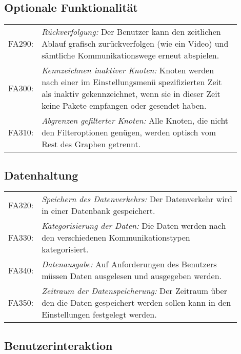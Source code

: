 \subsection{Optionale Funktionalität}
\begin{tabular}{lp{0.9\linewidth}}

FA290: & \textit{Rückverfolgung: }Der Benutzer kann den zeitlichen Ablauf grafisch zurückverfolgen (wie ein Video) und sämtliche Kommunikationswege erneut abspielen. \\

FA300: & \textit{Kennzeichnen inaktiver Knoten: }Knoten werden nach einer im Einstellungsmenü spezifizierten Zeit als inaktiv gekennzeichnet, wenn sie in dieser Zeit keine Pakete empfangen oder gesendet haben. \\

FA310: & \textit{Abgrenzen gefilterter Knoten: }Alle Knoten, die nicht den Filteroptionen genügen, werden optisch vom Rest des Graphen getrennt. \\

\end{tabular}

\subsection{Datenhaltung}

\begin{tabular}{lp{0.9\linewidth}}

FA320: & \textit{Speichern des Datenverkehrs: }Der Datenverkehr wird in einer Datenbank gespeichert. \\

FA330: & \textit{Kategorisierung der Daten: }Die Daten werden nach den verschiedenen Kommunikationstypen kategorisiert. \\

FA340: & \textit{Datenausgabe: }Auf Anforderungen des Benutzers müssen Daten ausgelesen und ausgegeben werden. \\

FA350: & \textit{Zeitraum der Datenspeicherung: }Der Zeitraum über den die Daten gespeichert werden sollen kann in den Einstellungen festgelegt werden. \\

\end{tabular}

\subsection{Benutzerinteraktion}

